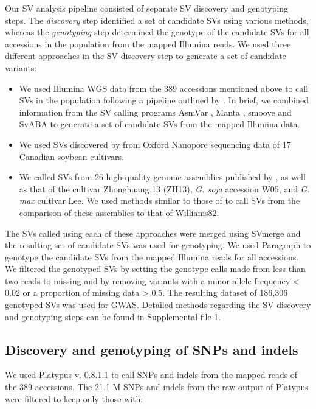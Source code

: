 \documentclass{article}
\begin{document}
Our SV analysis pipeline consisted of separate SV discovery and genotyping steps.
The \emph{discovery} step identified a set of candidate SVs using various methods,
whereas the \emph{genotyping} step determined the genotype
of the candidate SVs for all accessions in the population from the mapped Illumina reads. We used three different
approaches in the SV discovery step to generate a set of candidate variants:

\begin{itemize}
	\item We used Illumina WGS data from the 389 accessions mentioned above
		to call SVs in the population following a pipeline outlined
		by . In brief, we combined information from
		the SV calling programs AsmVar , Manta ,
		smoove  and SvABA  to generate
		a set of candidate SVs from the mapped Illumina data.
	\item We used SVs discovered by  from Oxford Nanopore
		sequencing data of 17 Canadian soybean cultivars.
	\item We called SVs from 26 high-quality genome assemblies published by
		, as well as that of the cultivar Zhonghuang 13 (ZH13),
		\textit{G. soja} accession W05, and \textit{G. max} cultivar Lee.
		We used methods similar to those of  to call
		SVs from the comparison of these assemblies to that of Williams82.
\end{itemize}

The SVs called using each of these approaches were merged using SVmerge
 and the resulting set of candidate SVs was used for
genotyping. We used Paragraph  to genotype the candidate SVs
from the mapped Illumina reads for all accessions. We filtered the genotyped
SVs by setting the genotype calls made from less than two reads to missing and
by removing variants with a minor allele frequency < 0.02 or a proportion of
missing data > 0.5. The resulting dataset of 186,306 genotyped SVs was used for
GWAS. Detailed methods regarding the SV discovery and genotyping steps can be
found in Supplemental file 1.

\subsection*{Discovery and genotyping of SNPs and indels}

We used Platypus v. 0.8.1.1  to call SNPs and indels from the
mapped reads of the 389 accessions. The 21.1 M SNPs and
indels from the raw output of Platypus were filtered to keep only those with:
\end{document}
